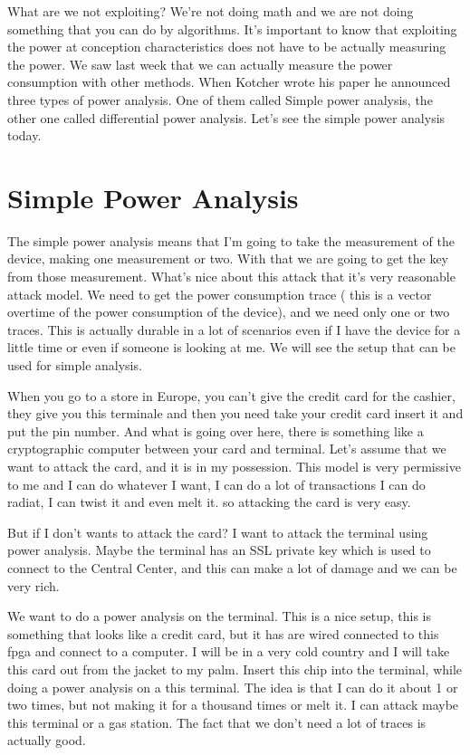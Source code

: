 What are we not exploiting? We're not doing math and we are not doing something that you can do by algorithms. It's important to know that exploiting the power at conception characteristics does not have to be actually measuring the power. We saw last week that we can actually measure the power consumption with other methods.
When Kotcher wrote his paper he announced three types of power analysis. One of them called Simple power analysis, the other one called differential power analysis. Let's see the simple power analysis today.

\section{Simple Power Analysis}

The simple power analysis means that I'm going to take the measurement of the device, making one measurement or two. With that we are going to get the key from those measurement. What's nice about this attack that it's very reasonable attack model. We need to get the power consumption trace ( this is a vector overtime of the power consumption of the device), and we need only one or two traces. This is actually durable in a lot of scenarios even if I have the device for a little time or even if someone is looking at me. We will see the setup that can be used for simple analysis. 

When you go to a store in Europe, you can't give the credit card for the cashier, they give you this terminale and then you need take your credit card insert it and put the pin number. 
And what is going over here, there is something like a cryptographic computer between your card and terminal. 
Let's assume that we want to attack the card, and it is in my possession. This model is very permissive to me and I can do whatever I want, I can do a lot of transactions I can do radiat, I can twist it and even melt it. so attacking the card is very easy.


But if I don't wants to attack the card? I want to attack the terminal using power analysis. Maybe the terminal has an SSL private key which is used to connect to the Central Center, and this can make a lot of damage and we can be very rich.

We want to do a power analysis on the terminal. This is a nice setup, this is something that looks like a credit card, but it has are wired connected to this fpga and connect to a computer. I will be in a very cold country and I will take this card out from the jacket to my palm. Insert this chip into the terminal, while doing a power analysis on a this terminal. The idea is that I can do it about 1 or two times, but not making it for a thousand times or melt it. I can attack maybe this terminal or a gas station. The fact that we don't need a lot of traces is actually good.

